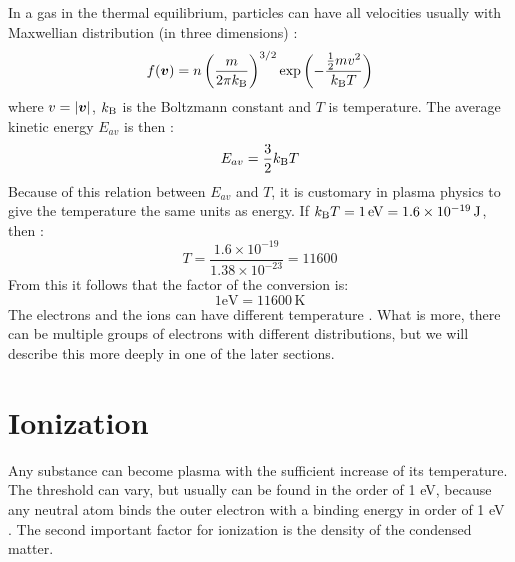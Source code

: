 In a gas in the thermal equilibrium, particles can have all velocities usually with Maxwellian distribution (in three dimensions) \cite{plasma-intro3}:
\begin{equation}
	f(\bm{v}) = n\left(\frac{m}{2\pi k_\mathrm{B}}\right)^{3/2}\exp\left(-\frac{\frac{1}{2}m v^2}{k_\mathrm{B} T}\right)
\end{equation} 
\noindent where $v = \lvert \bm{v} \rvert$, $k_\mathrm{B}$ is the Boltzmann constant and $T$ is temperature. The average kinetic energy $E_{av}$ is then \cite{plasma-intro3}:
\begin{equation}
	E_{av}=\frac{3}{2}k_\mathrm{B} T
\end{equation}
Because of this relation between $E_{av}$ and $T$, it is customary in plasma physics to give the temperature the same units as energy. If $k_\mathrm{B} T = 1 \, \mathrm{eV} = 1.6 \times 10^{-19}\, \mathrm{J}$, then \cite{plasma-intro3}:
\begin{equation}
	T = \frac{1.6 \times 10^{-19}}{1.38\times 10^{-23}}=11600
\end{equation}
\noindent From this it follows that the factor of the conversion is:
\begin{equation}
	1 \mathrm{eV} = 11600\,\mathrm{K}
\end{equation} 
The electrons and the ions can have different temperature \cite{plasma-intro3}. What is more, there can be multiple groups of electrons with different distributions, but we will describe this more deeply in one of the later sections.

\section{Ionization}
Any substance can become plasma with the sufficient increase of its temperature. The threshold can vary, but usually can be found in the order of 1 eV, because any neutral atom binds the outer electron with a binding energy in order of 1 eV \cite{laser-plasma1}. The second important factor for ionization is the density of the condensed matter.

